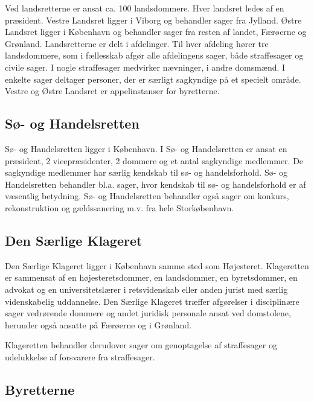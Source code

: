 \documentclass[]{book}
\begin{document}
Ved landsretterne er ansat ca. 100 landsdommere. Hver landsret ledes af en præsident.
Vestre Landsret ligger i Viborg og behandler sager fra Jylland.
Østre Landsret ligger i København og behandler sager fra resten af landet, Færøerne og Grønland.
Landsretterne er delt i afdelinger. Til hver afdeling hører tre landsdommere, som i fællesskab afgør alle afdelingens sager, både straffesager og civile sager. I nogle straffesager medvirker nævninger, i andre domsmænd. I enkelte sager deltager personer, der er særligt sagkyndige på et specielt område.
Vestre og Østre Landsret er appelinstanser for byretterne.

\hypertarget{s--og-handelsretten}{%
\subsection{Sø- og Handelsretten}\label{s--og-handelsretten}}

Sø- og Handelsretten ligger i København. I Sø- og Handelsretten er ansat en præsident, 2 vicepræsidenter, 2 dommere og et antal sagkyndige medlemmer. De sagkyndige medlemmer har særlig kendskab til sø- og handelsforhold.
Sø- og Handelsretten behandler bl.a. sager, hvor kendskab til sø- og handelsforhold er af væsentlig betydning.
Sø- og Handelsretten behandler også sager om konkurs, rekonstruktion og gældssanering m.v. fra hele Storkøbenhavn.

\hypertarget{den-srlige-klageret}{%
\subsection{Den Særlige Klageret}\label{den-srlige-klageret}}

Den Særlige Klageret ligger i København samme sted som Højesteret. Klageretten er sammensat af en højesteretsdommer, en landsdommer, en byretsdommer, en advokat og en universitetslærer i retsvidenskab eller anden jurist med særlig videnskabelig uddannelse.
Den Særlige Klageret træffer afgørelser i disciplinære sager vedrørende dommere og andet juridisk personale ansat ved domstolene, herunder også ansatte på Færøerne og i Grønland.

Klageretten behandler derudover sager om genoptagelse af straffesager og udelukkelse af forsvarere fra straffesager.

\hypertarget{byretterne}{%
\subsection{Byretterne}\label{byretterne}}
\end{document}
